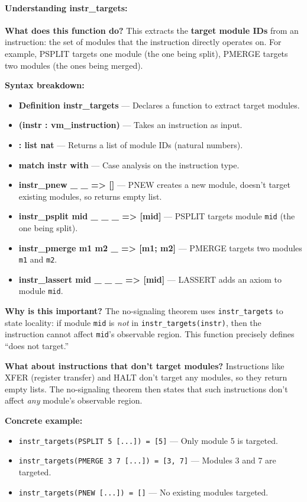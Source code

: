 \paragraph{Understanding instr\_targets:}

\textbf{What does this function do?} This extracts the \textbf{target module IDs} from an instruction: the set of modules that the instruction directly operates on. For example, PSPLIT targets one module (the one being split), PMERGE targets two modules (the ones being merged).

\textbf{Syntax breakdown:}
\begin{itemize}
    \item \textbf{Definition instr\_targets} — Declares a function to extract target modules.
    \item \textbf{(instr : vm\_instruction)} — Takes an instruction as input.
    \item \textbf{: list nat} — Returns a list of module IDs (natural numbers).
    \item \textbf{match instr with} — Case analysis on the instruction type.
    \item \textbf{instr\_pnew \_ \_ => []} — PNEW creates a new module, doesn't target existing modules, so returns empty list.
    \item \textbf{instr\_psplit mid \_ \_ \_ => [mid]} — PSPLIT targets module \texttt{mid} (the one being split).
    \item \textbf{instr\_pmerge m1 m2 \_ => [m1; m2]} — PMERGE targets two modules \texttt{m1} and \texttt{m2}.
    \item \textbf{instr\_lassert mid \_ \_ \_ => [mid]} — LASSERT adds an axiom to module \texttt{mid}.
\end{itemize}

\textbf{Why is this important?} The no-signaling theorem uses \texttt{instr\_targets} to state locality: if module \texttt{mid} is \textit{not} in \texttt{instr\_targets(instr)}, then the instruction cannot affect \texttt{mid}'s observable region. This function precisely defines ``does not target.''

\textbf{What about instructions that don't target modules?} Instructions like XFER (register transfer) and HALT don't target any modules, so they return empty lists. The no-signaling theorem then states that such instructions don't affect \textit{any} module's observable region.

\textbf{Concrete example:}
\begin{itemize}
    \item \texttt{instr\_targets(PSPLIT 5 [...]) = [5]} — Only module 5 is targeted.
    \item \texttt{instr\_targets(PMERGE 3 7 [...]) = [3, 7]} — Modules 3 and 7 are targeted.
    \item \texttt{instr\_targets(PNEW [...]) = []} — No existing modules targeted.
\end{itemize}



